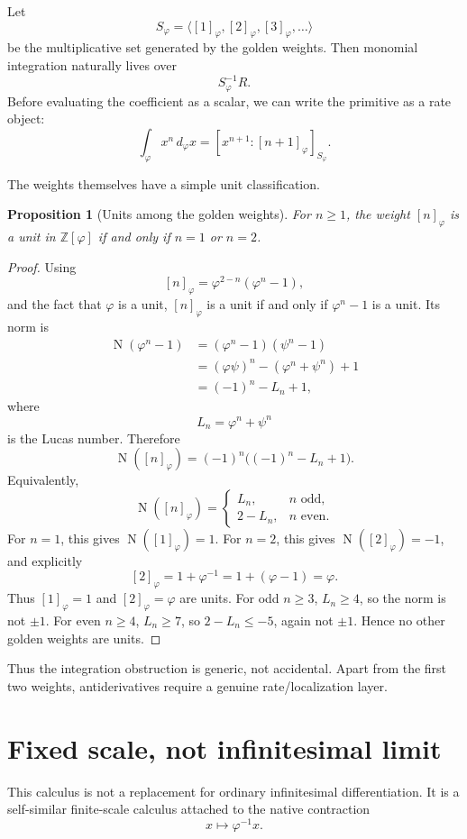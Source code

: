 \documentclass[11pt]{article}
\newtheorem{proposition}[definition]{Proposition}
\newcommand{\Nm}{\operatorname{N}}
\newcommand{\ph}{\varphi}
\newcommand{\ps}{\psi}
\newcommand{\Z}{\mathbb{Z}}
\begin{document}
Let
\[
    S_{\ph}=\langle [1]_{\ph},[2]_{\ph},[3]_{\ph},\ldots\rangle
\]
be the multiplicative set generated by the golden weights.  Then monomial integration naturally lives over
\[
    S_{\ph}^{-1}R.
\]
Before evaluating the coefficient as a scalar, we can write the primitive as a rate object:
\[
    \int_{\ph}x^n\,d_{\ph}x
    =[x^{n+1}:[n+1]_{\ph}]_{S_{\ph}}.
\]

The weights themselves have a simple unit classification.

\begin{proposition}[Units among the golden weights]
For $n\ge1$, the weight $[n]_{\ph}$ is a unit in $\Z[\ph]$ if and only if $n=1$ or $n=2$.
\end{proposition}

\begin{proof}
Using
\[
    [n]_{\ph}=\ph^{2-n}(\ph^n-1),
\]
and the fact that $\ph$ is a unit, $[n]_{\ph}$ is a unit if and only if $\ph^n-1$ is a unit.  Its norm is
\begin{align*}
    \Nm(\ph^n-1)
    &=(\ph^n-1)(\ps^n-1)\\
    &=(\ph\ps)^n-(\ph^n+\ps^n)+1\\
    &=(-1)^n-L_n+1,
\end{align*}
where
\[
    L_n=\ph^n+\ps^n
\]
is the Lucas number.  Therefore
\[
    \Nm([n]_{\ph})=(-1)^n\bigl((-1)^n-L_n+1\bigr).
\]
Equivalently,
\[
    \Nm([n]_{\ph})=
    \begin{cases}
        L_n, & n\text{ odd},\\
        2-L_n, & n\text{ even}.
    \end{cases}
\]
For $n=1$, this gives $\Nm([1]_{\ph})=1$.  For $n=2$, this gives $\Nm([2]_{\ph})=-1$, and explicitly
\[
    [2]_{\ph}=1+\ph^{-1}=1+(\ph-1)=\ph.
\]
Thus $[1]_{\ph}=1$ and $[2]_{\ph}=\ph$ are units.  For odd $n\ge3$, $L_n\ge4$, so the norm is not $\pm1$.  For even $n\ge4$, $L_n\ge7$, so $2-L_n\le -5$, again not $\pm1$.  Hence no other golden weights are units.
\end{proof}

Thus the integration obstruction is generic, not accidental.  Apart from the first two weights, antiderivatives require a genuine rate/localization layer.

\section{Fixed scale, not infinitesimal limit}

This calculus is not a replacement for ordinary infinitesimal differentiation.  It is a self-similar finite-scale calculus attached to the native contraction
\[
    x\mapsto \ph^{-1}x.
\]
\end{document}
